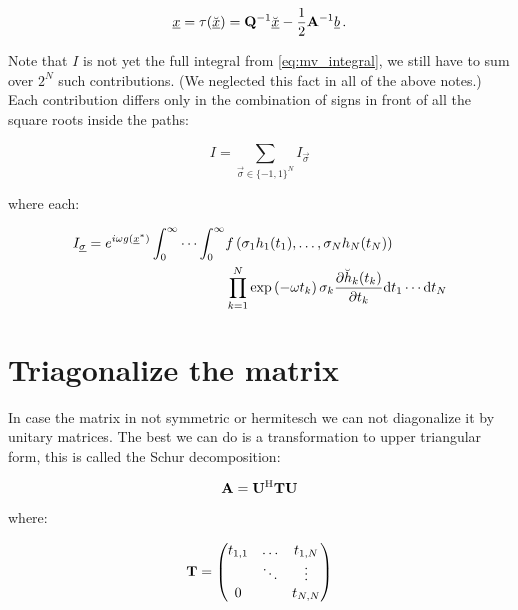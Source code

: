 \documentclass[a4paper,10pt]{article}
\begin{document}
\begin{equation}
 \underline{x} = \tau(\breve{\underline{x}}) = \mathbf{Q}{}^{-1} \breve{\underline{x}} - \frac{1}{2}\mathbf{A}{}^{-1} \underline{b} \,.
\end{equation}


Note that $I$ is not yet the full integral from \eqref{eq:mv_integral},
we still have to sum over $2^N$ such contributions.  (We neglected this
fact in all of the above notes.) Each contribution differs only in the
combination of signs in front of all the square roots inside the paths:

\begin{equation}
 I = \sum_{\vec{\sigma} \in \{-1,1\}^N} I_{\vec{\sigma}}
\end{equation}

where each:

\begin{equation}
\begin{split}
 I_{\underline{\sigma}} =
       e^{i \omega g\left(\underline{x}^{*}\right)}
       \int_0^\infty \cdots \int_0^\infty
       & f\left(
           \sigma_1 h_1(t_1),
           \ldots,
           \sigma_N h_N(t_N)
         \right) \\
       & \prod_{k=1}^N
           \exp\left(-\omega t_k\right)
           \sigma_k \frac{\partial \breve{h}_k(t_k)}{\partial t_k}
       \mathrm{d}t_1 \cdots \mathrm{d}t_N
\end{split}
\end{equation}


\section{Triagonalize the matrix}
\label{sec:mv_triag}

In case the matrix in not symmetric or hermitesch we can not diagonalize
it by unitary matrices. The best we can do is a transformation to upper
triangular form, this is called the Schur decomposition:

\begin{equation}
 \mathbf{A} = \mathbf{U}{}^{\textnormal{H}} \mathbf{T} \mathbf{U}
\end{equation}

where:

\begin{equation}
 \mathbf{T} =
 \begin{pmatrix}
  t_{1,1} & \hdots & t_{1,N} \\
          & \ddots & \vdots \\
  0       &        & t_{N,N}
 \end{pmatrix}
\end{equation}
\end{document}
